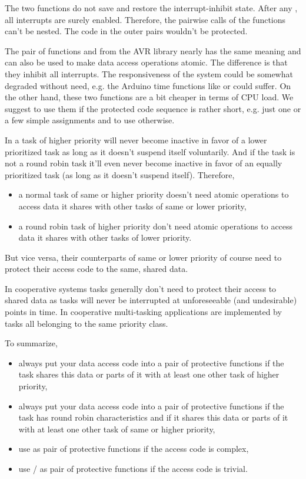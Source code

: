 The two functions do not save and restore the interrupt-inhibit state.
After any , all interrupts are
surely enabled. Therefore, the pairwise calls of the functions can't be
nested. The code in the outer pairs wouldn't be protected.

The pair of functions  and  from the AVR library
nearly has the same meaning and can also be used to make data access
operations atomic. The difference is that they inhibit all interrupts. The
responsiveness of the system could be somewhat degraded without need, e.g.
the Arduino time functions like  or  could
suffer. On the other hand, these two functions are a bit cheaper in terms
of CPU load. We suggest to use them if the protected code sequence is
rather short, e.g. just one or a few simple assignments and to use
 otherwise.

In \rtos{} a task of higher priority will never become inactive in favor
of a lower prioritized task as long as it doesn't suspend itself
voluntarily. And if the task is not a round robin task it'll even never
become inactive in favor of an equally prioritized task (as long as it
doesn't suspend itself). Therefore,
\begin{itemize}
  \item a normal task of same or higher priority doesn't need atomic
    operations to access data it shares with other tasks of same or lower
    priority,
  \item a round robin task of higher priority don't need atomic operations
    to access data it shares with other tasks of lower priority.
\end{itemize}
But vice versa, their counterparts of same or lower priority of course need to
protect their access code to the same, shared data.

In cooperative systems tasks generally don't need to protect their access
to shared data as tasks will never be interrupted at unforeseeable (and
undesirable) points in time. In \rtos{} cooperative multi-tasking
applications are implemented by tasks all belonging to the same priority
class.

To summarize, 
\begin{itemize}
  \item always put your data access code into a pair of protective
    functions if the task shares this data or parts of it with at least
    one other task of higher priority,
  \item always put your data access code into a pair of protective
    functions if the task has round robin characteristics and if it shares
    this data or parts of it with at least one other task of same or higher
    priority,
  \item use  as pair of protective
    functions if the access code is complex,
  \item use / as pair of protective functions if the
    access code is trivial.
\end{itemize}



